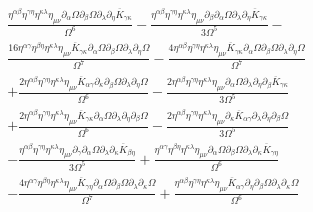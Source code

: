 \documentclass[10pt,letterpaper]{article}
\numberwithin{equation}{section}
\begin{document}
\begin{align}
&\frac{\eta^{\alpha \beta} \eta^{\gamma \eta} \eta^{\kappa \lambda} \eta_{\mu \nu} \partial_{\alpha}\Omega \partial_{\beta}\Omega \partial_{\lambda}\partial_{\eta}\overline{K}_{\gamma \kappa}}{\Omega^6} -  \frac{\eta^{\alpha \beta} \eta^{\gamma \eta} \eta^{\kappa \lambda} \eta_{\mu \nu} \partial_{\beta}\partial_{\alpha}\Omega \partial_{\lambda}\partial_{\eta}\overline{K}_{\gamma \kappa}}{3 \Omega^5} - \nonumber \\
& \frac{16 \eta^{\alpha \gamma} \eta^{\beta \eta} \eta^{\kappa \lambda} \eta_{\mu \nu} \overline{K}_{\gamma \kappa} \partial_{\alpha}\Omega \partial_{\beta}\Omega \partial_{\lambda}\partial_{\eta}\Omega}{\Omega^7} -  \frac{4 \eta^{\alpha \beta} \eta^{\gamma \eta} \eta^{\kappa \lambda} \eta_{\mu \nu} \overline{K}_{\gamma \kappa} \partial_{\alpha}\Omega \partial_{\beta}\Omega \partial_{\lambda}\partial_{\eta}\Omega}{\Omega^7} \nonumber \\
&+ \frac{2 \eta^{\alpha \beta} \eta^{\gamma \eta} \eta^{\kappa \lambda} \eta_{\mu \nu} \overline{K}_{\alpha \gamma} \partial_{\kappa}\partial_{\beta}\Omega \partial_{\lambda}\partial_{\eta}\Omega}{\Omega^6} -  \frac{2 \eta^{\alpha \beta} \eta^{\gamma \eta} \eta^{\kappa \lambda} \eta_{\mu \nu} \partial_{\alpha}\Omega \partial_{\lambda}\partial_{\eta}\partial_{\beta}\overline{K}_{\gamma \kappa}}{3 \Omega^5}\nonumber \\
& + \frac{2 \eta^{\alpha \beta} \eta^{\gamma \eta} \eta^{\kappa \lambda} \eta_{\mu \nu} \overline{K}_{\gamma \kappa} \partial_{\alpha}\Omega \partial_{\lambda}\partial_{\eta}\partial_{\beta}\Omega}{\Omega^6} -  \frac{2 \eta^{\alpha \beta} \eta^{\gamma \eta} \eta^{\kappa \lambda} \eta_{\mu \nu} \partial_{\kappa}\overline{K}_{\alpha \gamma} \partial_{\lambda}\partial_{\eta}\partial_{\beta}\Omega}{3 \Omega^5}\nonumber \\
& -  \frac{\eta^{\alpha \beta} \eta^{\gamma \eta} \eta^{\kappa \lambda} \eta_{\mu \nu} \partial_{\gamma}\partial_{\alpha}\Omega \partial_{\lambda}\partial_{\kappa}\overline{K}_{\beta \eta}}{3 \Omega^5} + \frac{\eta^{\alpha \gamma} \eta^{\beta \eta} \eta^{\kappa \lambda} \eta_{\mu \nu} \partial_{\alpha}\Omega \partial_{\beta}\Omega \partial_{\lambda}\partial_{\kappa}\overline{K}_{\gamma \eta}}{\Omega^6}\nonumber \\
& -  \frac{4 \eta^{\alpha \gamma} \eta^{\beta \eta} \eta^{\kappa \lambda} \eta_{\mu \nu} \overline{K}_{\gamma \eta} \partial_{\alpha}\Omega \partial_{\beta}\Omega \partial_{\lambda}\partial_{\kappa}\Omega}{\Omega^7} + \frac{\eta^{\alpha \beta} \eta^{\gamma \eta} \eta^{\kappa \lambda} \eta_{\mu \nu} \overline{K}_{\alpha \gamma} \partial_{\eta}\partial_{\beta}\Omega \partial_{\lambda}\partial_{\kappa}\Omega}{\Omega^6} \nonumber \\

\end{align}
\end{document}
